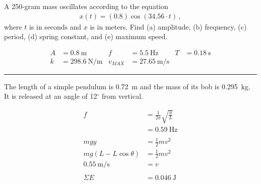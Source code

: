 \documentclass[12pt]{exam}
\begin{document}
\Large

\def\mystrut{\protect\rule[-2.2ex]{0ex}{2.2ex}} 
\qformat{ \textbf{Task \#\thequestion}
  \mystrut  \hfill}


\begin{questions}


\question
  A 250-gram mass oscillates according to the equation
  \begin{align*}
    x(t) = (0.8)\cos(34.56\cdot t) \, ,
  \end{align*}
  where $t$ is in seconds and $x$ is in meters. Find (a) amplitude, (b) frequency, (c) period, (d) spring constant, and (e) maximum speed.

  \begin{solution}
    \begin{align*}
      A &= 0.8~\text{m} &
      f &= 5.5~\text{Hz} &
      T &= 0.18~\text{s} \\
      k &= 298.6~\text{N/m} &
      v_{MAX} &= 27.65~\text{m/s}
    \end{align*}
  \end{solution}

\vs \hrule \vs

\question
   The length of a simple pendulum is 0.72~m and the mass of its bob is 0.295~kg.  It is released at an angle of 12$^\circ$ from vertical.  


  \begin{solution}
    \begin{align*}
      f &= \frac{1}{2\pi}\sqrt{\frac{g}{L}} \\
        &= 0.59~\text{Hz} \\\\
      mgy &= \frac{1}{2}mv^2 \\
      mg\left(L-L\cos\theta\right) &= \frac{1}{2}mv^2 \\
      0.55~\text{m/s} &= v \\\\
      \Sigma E &= 0.046~\text{J}
    \end{align*}
  \end{solution}






\end{questions}
\end{document}
